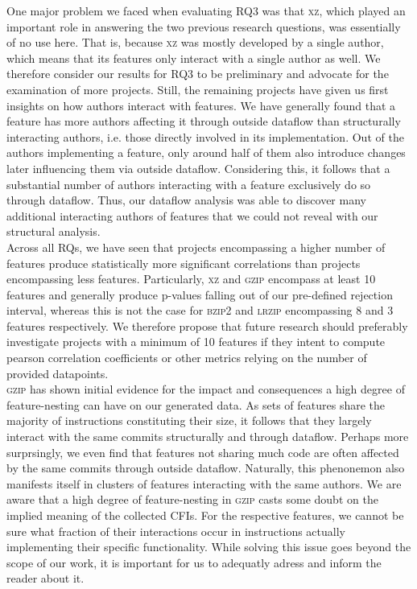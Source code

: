 One major problem we faced when evaluating RQ3 was that \textsc{xz}, which played an important role in answering the two previous research questions, was essentially of no use here.
That is, because \textsc{xz} was mostly developed by a single author, which means that its features only interact with a single author as well.
We therefore consider our results for RQ3 to be preliminary and advocate for the examination of more projects.
Still, the remaining projects have given us first insights on how authors interact with features.
We have generally found that a feature has more authors affecting it through outside dataflow than structurally interacting authors, i.e. those directly involved in its implementation.
Out of the authors implementing a feature, only around half of them also introduce changes later influencing them via outside dataflow.
Considering this, it follows that a substantial number of authors interacting with a feature exclusively do so through dataflow.
Thus, our dataflow analysis was able to discover many additional interacting authors of features that we could not reveal with our structural analysis. \\
Across all RQs, we have seen that projects encompassing a higher number of features produce statistically more significant correlations than projects encompassing less features.
Particularly, \textsc{xz} and \textsc{gzip} encompass at least 10 features and generally produce p-values falling out of our pre-defined rejection interval, whereas this is not the case for \textsc{bzip2} and \textsc{lrzip} encompassing 8 and 3 features respectively.
We therefore propose that future research should preferably investigate projects with a minimum of 10 features if they intent to compute pearson correlation coefficients or other metrics relying on the number of provided datapoints. \\
\textsc{gzip} has shown initial evidence for the impact and consequences a high degree of feature-nesting can have on our generated data.
As sets of features share the majority of instructions constituting their size, it follows that they largely interact with the same commits structurally and through dataflow.
Perhaps more surprsingly, we even find that features not sharing much code are often affected by the same commits through outside dataflow. %
Naturally, this phenonemon also manifests itself in clusters of features interacting with the same authors.
We are aware that a high degree of feature-nesting in \textsc{gzip} casts some doubt on the implied meaning of the collected CFIs.
For the respective features, we cannot be sure what fraction of their interactions occur in instructions actually implementing their specific functionality.
While solving this issue goes beyond the scope of our work, it is important for us to adequatly adress and inform the reader about it.

